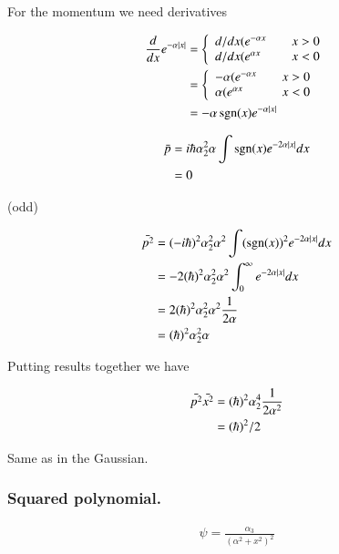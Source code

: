 \documentclass{article}
\DeclareMathOperator{\sgn}{sgn}
\begin{document}
For the momentum we need derivatives

\begin{align*}
\frac{d}{dx} e^{-\alpha \Abs{x}} 
&=
\left\{
\begin{array}{l l}
d/dx(e^{-\alpha x} & \quad \mbox{$x>0$} \\
d/dx(e^{\alpha x} & \quad \mbox{$x<0$} \\
\end{array}
\right. \\
&=
\left\{
\begin{array}{l l}
-\alpha (e^{-\alpha x} & \quad \mbox{$x>0$} \\
\alpha (e^{\alpha x} & \quad \mbox{$x<0$} \\
\end{array}
\right. \\
&=
-\alpha \sgn(x) e^{-\alpha \Abs{x}}
\end{align*}

\begin{align*}
\bar{p} 
&= i \hbar \alpha_2^2 \alpha \int \sgn(x) e^{-2\alpha\Abs{x}} dx  \\
&= 0
\end{align*}

(odd)

\begin{align*}
\bar{p^2} 
&= (-i \hbar)^2 \alpha_2^2 \alpha^2 \int (\sgn(x))^2 e^{-2\alpha\Abs{x}} dx  \\
&= - 2(\hbar)^2 \alpha_2^2 \alpha^2 \int_0^\infty e^{-2\alpha\Abs{x}} dx  \\
&= 2(\hbar)^2 \alpha_2^2 \alpha^2 \inv{2\alpha} \\
&= (\hbar)^2 \alpha_2^2 \alpha \\
\end{align*}

Putting results together we have

\begin{align*}
\bar{p^2} \bar{x^2} 
&= (\hbar)^2 \alpha_2^4 \frac{1}{2 \alpha^2} \\
&= (\hbar)^2/2
\end{align*}

Same as in the Gaussian.

\subsubsection{ Squared polynomial. }

\begin{align*}
\psi = \frac{\alpha_3}{(\alpha^2 + x^2)^2}
\end{align*}
\end{document}

